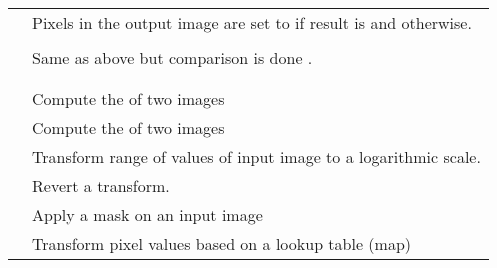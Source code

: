 \begin{table}[h!]
\begin{tabularx}{\linewidth}{|l|Y|}
                & Pixels in the output image are set to  if result is  and  otherwise. \\
               &  \\
    \hline
                 & Same as above but comparison is done .  \\
                  &  \\
                 &  \\
    \hline
                    & Compute the  of two images  \\
                    & Compute the  of two images  \\
    \hline
                  & Transform range of values of input image to a logarithmic scale.  \\
                  & Revert a  transform.  \\
    \hline
               & Apply a mask on an input image  \\
    \hline
        & Transform pixel values based on a lookup table (map)  \\
    \hline
  \end{tabularx}
\end{table}
